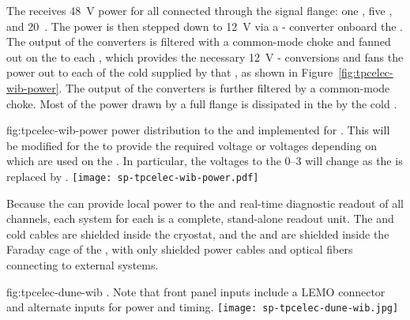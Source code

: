 The  %
receives \SI{48}{V}  power for all  %
connected through the  signal flange: 
one , five , and \num{20}~. 
The  power is then stepped down to \SI{12}{V} via 
a - converter onboard the . The output 
of the  converters is filtered with a common-mode choke 
and fanned out on the  to each , which provides the 
necessary \SI{12}{V} - conversions and fans
the  power out to each of the cold  supplied 
by that , as shown in Figure~\ref{fig:tpcelec-wib-power}. 
The output of the  converters is further filtered by a 
common-mode choke. Most of the power drawn by a full flange is 
dissipated in the  by the cold .

\begin{dunefigure}
{fig:tpcelec-wib-power}
{ power distribution to the  and  
implemented for . This will be modified for the 
 to provide the required voltage or voltages 
depending on which  are used on the . 
In particular, the voltages to the  \numrange{0}{3} 
will change as the   is replaced by . }
\texttt{[image: sp-tpcelec-wib-power.pdf]}
\end{dunefigure}

Because the  can provide local power to the  
and real-time diagnostic readout of all channels, each  
system for each  is a complete, stand-alone readout unit. 
The  and cold cables are shielded inside the cryostat, 
and the  and  are shielded inside the Faraday 
cage of the , with only shielded power 
cables and optical fibers connecting to external systems.

\begin{dunefigure}
{fig:tpcelec-dune-wib}
{. Note that front panel inputs include 
a LEMO connector and alternate inputs for  power and timing.}
\texttt{[image: sp-tpcelec-dune-wib.jpg]}
\end{dunefigure}

